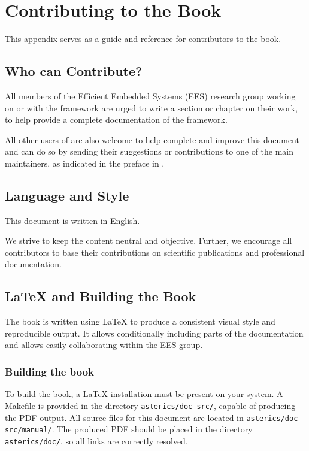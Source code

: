 
\section{Contributing to the \asterics Book}

This appendix serves as a guide and reference for contributors to the \asterics book.

\subsection{Who can Contribute?}

All members of the Efficient Embedded Systems (EES) research group working on or with the \asterics framework are urged to write a section or chapter on their work, to help provide a complete documentation of the framework.

All other users of \asterics are also welcome to help complete and improve this document and can do so by sending their suggestions or contributions to one of the main maintainers, as indicated in the preface in .

\subsection{Language and Style}

This document is written in English.

We strive to keep the content neutral and objective.
Further, we encourage all contributors to base their contributions on scientific publications and professional documentation.

\subsection{\LaTeX{} and Building the \asterics Book}

The \asterics book is written using \LaTeX{} to produce a consistent visual style and reproducible output.
It allows conditionally including parts of the documentation and allows easily collaborating within the EES group.


\subsubsection{Building the \asterics book}


To build the \asterics book, a \LaTeX{} installation must be present on your system.
A Makefile is provided in the directory \texttt{asterics/doc-src/}, capable of producing the PDF output.
All source files for this document are located in \texttt{asterics/doc-src/manual/}.
The produced PDF should be placed in the directory \texttt{asterics/doc/}, so all links are correctly resolved.
\bigskip


